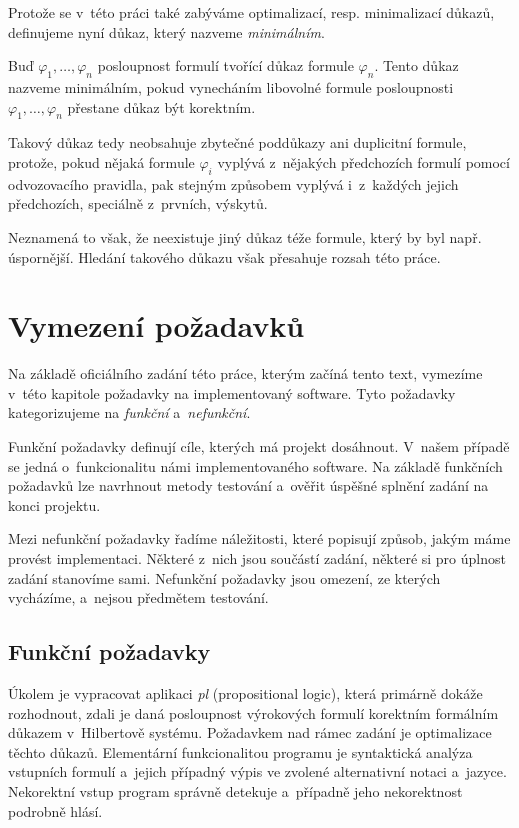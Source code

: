 \documentclass[thesis=B,czech,hidelinks]{thesis}[2012/06/26]
\begin{document}
Protože se v~této práci také zabýváme optimalizací, resp. minimalizací důkazů, definujeme nyní důkaz, který nazveme \emph{minimálním}.

\begin{dfn}
\label{dfn:minimal_proof}
Buď $\varphi_1, \ldots, \varphi_n$ posloupnost formulí tvořící důkaz formule $\varphi_n$. Tento důkaz nazveme minimálním, pokud vynecháním libovolné formule posloupnosti $\varphi_1, \ldots, \varphi_n$ přestane důkaz být korektním.
\end{dfn}

Takový důkaz tedy neobsahuje zbytečné poddůkazy ani duplicitní formule, protože, pokud nějaká formule $\varphi_i$ vyplývá z~nějakých předchozích formulí pomocí odvozovacího pravidla, pak stejným způsobem vyplývá i~z~každých jejich předchozích, speciálně z~prvních, výskytů.

Neznamená to však, že neexistuje jiný důkaz téže formule, který by byl např. úspornější. Hledání takového důkazu však přesahuje rozsah této práce.

%
%
%

\chapter{Vymezení požadavků}

Na základě oficiálního zadání této práce, kterým začíná tento text, vymezíme v~této kapitole požadavky na implementovaný software. Tyto požadavky kategorizujeme na \emph{funkční} a~\emph{nefunkční}.

Funkční požadavky definují cíle, kterých má projekt dosáhnout. V~našem případě se jedná o~funkcionalitu námi implementovaného software. Na základě funkčních požadavků lze navrhnout metody testování a~ověřit úspěšné splnění zadání na konci projektu.

Mezi nefunkční požadavky řadíme náležitosti, které popisují způsob, jakým máme provést implementaci. Některé z~nich jsou součástí zadání, některé si pro úplnost zadání stanovíme sami. Nefunkční požadavky jsou omezení, ze kterých vycházíme, a~nejsou předmětem testování.

\section{Funkční požadavky}

Úkolem je vypracovat aplikaci \emph{pl} (propositional logic), která primárně dokáže rozhodnout, zdali je daná posloupnost výrokových formulí korektním formálním důkazem v~Hilbertově systému. Požadavkem nad rámec zadání je optimalizace těchto důkazů. Elementární funkcionalitou programu je syntaktická analýza vstupních formulí a~jejich případný výpis ve zvolené alternativní notaci a~jazyce. Nekorektní vstup program správně detekuje a~případně jeho nekorektnost podrobně hlásí.
\end{document}
